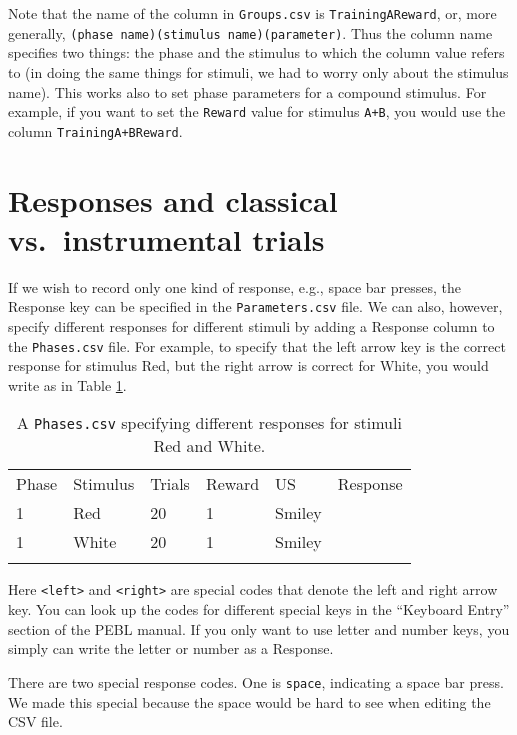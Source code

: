 \documentclass[11pt,]{article}
\renewcommand{\medskip}{}
\begin{document}
Note that the name of the column in \texttt{Groups.csv} is
\texttt{TrainingAReward}, or, more generally,
\texttt{(phase name)(stimulus name)(parameter)}. Thus the column name
specifies two things: the phase and the stimulus to which the column
value refers to (in doing the same things for stimuli, we had to worry
only about the stimulus name). This works also to set phase parameters
for a compound stimulus. For example, if you want to set the
\texttt{Reward} value for stimulus \texttt{A+B}, you would use the
column \texttt{TrainingA+BReward}.

\section{Responses and classical vs.~instrumental trials}

If we wish to record only one kind of response, e.g., space bar presses,
the Response key can be specified in the \texttt{Parameters.csv} file.
We can also, however, specify different responses for different stimuli
by adding a Response column to the \texttt{Phases.csv} file. For
example, to specify that the left arrow key is the correct response for
stimulus Red, but the right arrow is correct for White, you would write
as in Table \ref{responses}.

\begin{longtable}[c]{@{}llllll@{}}
\hline\noalign{\medskip}
Phase & Stimulus & Trials & Reward & US & Response
\\\noalign{\medskip}
\hline\noalign{\medskip}
1 & Red & 20 & 1 & Smiley &
\\\noalign{\medskip}
1 & White & 20 & 1 & Smiley &
\\\noalign{\medskip}
\hline
\noalign{\medskip}
\caption{A \texttt{Phases.csv} specifying different responses for
stimuli Red and White. \label{responses}}
\end{longtable}

Here \texttt{\textless{}left\textgreater{}} and
\texttt{\textless{}right\textgreater{}} are special codes that denote
the left and right arrow key. You can look up the codes for different
special keys in the ``Keyboard Entry'' section of the PEBL manual. If
you only want to use letter and number keys, you simply can write the
letter or number as a Response.

There are two special response codes. One is \texttt{space}, indicating
a space bar press. We made this special because the space would be hard
to see when editing the CSV file.
\end{document}
